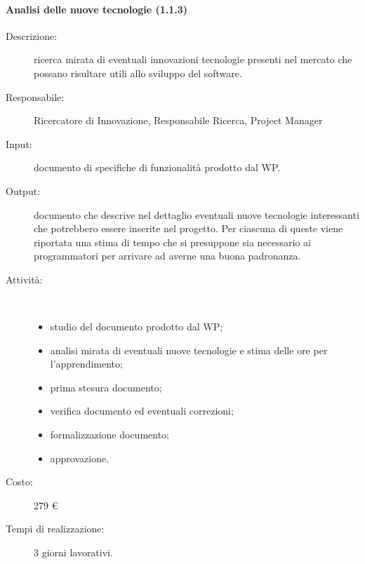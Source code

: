 \paragraph{Analisi delle nuove tecnologie (1.1.3)}
\begin{description}
\item[Descrizione:] ricerca mirata di eventuali innovazioni tecnologie presenti nel mercato che possano risultare utili allo sviluppo del software.
\item[Responsabile:] Ricercatore di Innovazione, Responsabile Ricerca, Project Manager
\item[Input:] documento di specifiche di funzionalit\`{a} prodotto dal WP.
\item[Output:] documento che descrive nel dettaglio eventuali nuove tecnologie interessanti che potrebbero essere inserite nel progetto. Per ciascuna di queste viene riportata una stima di tempo che si presuppone sia necessario ai programmatori per arrivare ad averne una buona padronanza.
\item[Attività:]\mbox{}\\[-1.5\baselineskip]
	\begin{itemize}
	\item studio del documento prodotto dal WP;
	\item analisi mirata di eventuali nuove tecnologie e stima delle ore per l'apprendimento;
	\item prima stesura documento;
	\item verifica documento ed eventuali correzioni;
	\item formalizzazione documento;
	\item approvazione.
	\end{itemize}
\item[Costo:] 279 \euro{}
\item[Tempi di realizzazione:] 3 giorni lavorativi.
\end{description}

